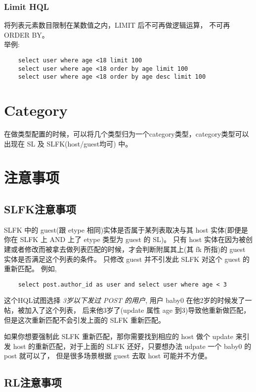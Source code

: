 \documentclass[10pt,a4paper]{article}
\begin{document}
\begin{CJK}{UTF8}{gbsn}
  \subsubsection{Limit HQL}

  将列表元素数目限制在某数值之内，LIMIT 后不可再做逻辑运算， 不可再 ORDER BY。\\

  举例:

\begin{verbatim}
    select user where age <18 limit 100
    select user where age <18 order by age limit 100
    select user where age <18 order by age desc limit 100
\end{verbatim}

  \section{Category}

  在做类型配置的时候，可以将几个类型归为一个category类型，category类型可以出现在 SL 及 SLFK(host/guest均可) 中。

  \section{注意事项}
  \subsection{SLFK注意事项}

  SLFK 中的 guest(跟 etype 相同)实体是否属于某列表取决与其 host 实体(即便是你在 SLFK 上 AND 上了 etype 类型为 guest 的 SL)。
  只有 host 实体在因为被创建或者修改而被拿去做列表匹配的时候，才会判断附属其上(其 fk 所指)的 guest 实体是否满足这个列表的条件。
  只修改 guest 并不引发此 SLFK 对这个 guest 的重新匹配。
  例如,
\begin{verbatim}
    select post.author_id as user and select user where age < 3
\end{verbatim}
  这个HQL试图选择 \emph{3岁以下发过 POST 的用户}, 用户 baby0 在他2岁的时候发了一帖，被加入了这个列表，
  后来他3岁了(update 属性 age 到3)导致他重新做匹配， 但是这次重新匹配不会引发上面的 SLFK 重新匹配。

  如果你想要强制此 SLFK 重新匹配，那你需要找到相应的 host 做个 update 来引发 host 的重新匹配，对于上面的 SLFK 还好，只要想办法 udpate 一个 baby0 的 post 就可以了， 但是很多场景根据 guest 去取 host 可能并不方便。

  \subsection{RL注意事项}


\end{CJK}
\end{document}
